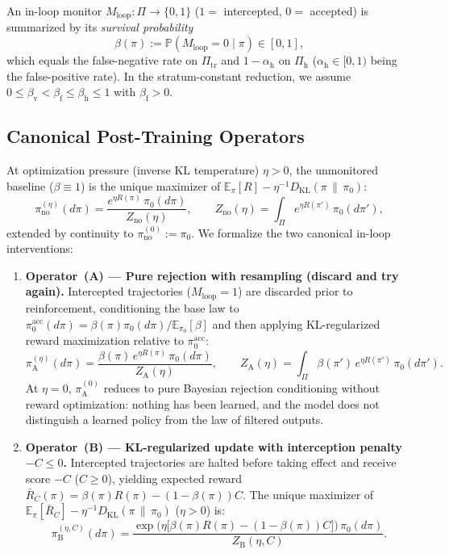 \documentclass[11pt,a4paper]{article}
\newcommand{\E}{\mathbb{E}}
\newcommand{\Prob}{\mathbb{P}}
\newcommand{\DKL}{D_{\mathrm{KL}}}
\begin{document}
An in-loop monitor $M_{\mathrm{loop}} : \Pi \to \{0, 1\}$ ($1 =$ intercepted, $0 =$ accepted) is summarized by its \emph{survival probability}
\begin{equation}
  \beta(\pi) := \Prob(M_{\mathrm{loop}} = 0 \mid \pi) \in [0, 1],
\end{equation}
which equals the false-negative rate on $\Pi_{\mathrm{tr}}$ and $1 - \alpha_{\mathrm{h}}$ on $\Pi_{\mathrm{h}}$ ($\alpha_{\mathrm{h}} \in [0, 1)$ being the false-positive rate). In the stratum-constant reduction, we assume $0 \le \beta_{\mathrm{v}} < \beta_{\mathrm{f}} \le \beta_{\mathrm{h}} \le 1$ with $\beta_{\mathrm{f}} > 0$.

\subsection{Canonical Post-Training Operators}
At optimization pressure (inverse KL temperature) $\eta > 0$, the unmonitored baseline ($\beta \equiv 1$) is the unique maximizer of $\E_{\pi}[R] - \eta^{-1}\DKL(\pi \,\|\, \pi_0)$:
\begin{equation}
  \pi_{\mathrm{no}}^{(\eta)}(d\pi) = \frac{e^{\eta R(\pi)}\,\pi_0(d\pi)}{Z_{\mathrm{no}}(\eta)},
  \qquad Z_{\mathrm{no}}(\eta) = \int_{\Pi} e^{\eta R(\pi')}\,\pi_0(d\pi'),
\end{equation}
extended by continuity to $\pi_{\mathrm{no}}^{(0)} := \pi_0$. We formalize the two canonical in-loop interventions:
\begin{enumerate}
  \item \textbf{Operator~(A) --- Pure rejection with resampling (discard and try again).} Intercepted trajectories ($M_{\mathrm{loop}} = 1$) are discarded prior to reinforcement, conditioning the base law to $\pi_0^{\mathrm{acc}}(d\pi) = \beta(\pi)\pi_0(d\pi)/\E_{\pi_0}[\beta]$ and then applying KL-regularized reward maximization relative to $\pi_0^{\mathrm{acc}}$:
  \begin{equation}
    \pi_{\mathrm{A}}^{(\eta)}(d\pi) = \frac{\beta(\pi)\,e^{\eta R(\pi)}\,\pi_0(d\pi)}{Z_{\mathrm{A}}(\eta)},
    \qquad Z_{\mathrm{A}}(\eta) = \int_{\Pi} \beta(\pi')\,e^{\eta R(\pi')}\,\pi_0(d\pi').
  \end{equation}
  At $\eta = 0$, $\pi_{\mathrm{A}}^{(0)}$ reduces to pure Bayesian rejection conditioning without reward optimization: nothing has been learned, and the model does not distinguish a learned policy from the law of filtered outputs.
  \item \textbf{Operator~(B) --- KL-regularized update with interception penalty $-C \le 0$.} Intercepted trajectories are halted before taking effect and receive score $-C$ ($C \ge 0$), yielding expected reward $\bar{R}_C(\pi) = \beta(\pi)R(\pi) - (1-\beta(\pi))C$. The unique maximizer of $\E_{\pi}[\bar{R}_C] - \eta^{-1}\DKL(\pi \,\|\, \pi_0)$ ($\eta > 0$) is:
  \begin{equation}
    \pi_{\mathrm{B}}^{(\eta, C)}(d\pi) = \frac{\exp\!\big(\eta\big[\beta(\pi)R(\pi) - (1-\beta(\pi))C\big]\big)\,\pi_0(d\pi)}{Z_{\mathrm{B}}(\eta, C)}.
  \end{equation}
\end{enumerate}
\end{document}
